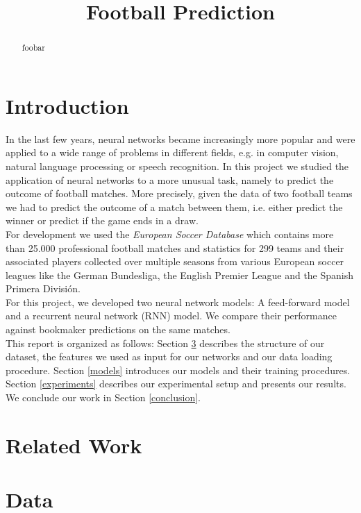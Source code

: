 \documentclass[a4paper]{article}
\title{Football Prediction}
\begin{document}
\maketitle
%
\begin{abstract}
foobar
\end{abstract}


%
\section{Introduction}
In the last few years, neural networks became increasingly more popular and were applied to a wide range of problems in different fields, e.g. in computer vision, natural language processing or speech recognition. In this project we studied the application of neural networks to a more unusual task, namely to predict the outcome of football matches. More precisely, given the data of two football teams we had to predict the outcome of a match between them, i.e. either predict the winner or predict if the game ends in a draw. \\
For development we used the \emph{European Soccer Database} \cite{1} which contains more than 25.000 professional football matches and statistics for 299 teams and their associated players collected over multiple seasons from various European soccer leagues like the German Bundesliga, the English Premier League and the Spanish Primera División. \\
For this project, we developed two neural network models: A feed-forward model and a recurrent neural network (RNN) model. We compare their performance against bookmaker predictions on the same matches. \\
This report is organized as follows: Section \ref{data} describes the structure of our dataset, the features we used as input for our networks and our data loading procedure. Section \ref{models} introduces our  models and their training procedures. Section \ref{experiments} describes our experimental setup and presents our results. We conclude our work in Section \ref{conclusion}.


\section{Related Work} \label{relatedwork}


\section{Data} \label{data}
\end{document}
